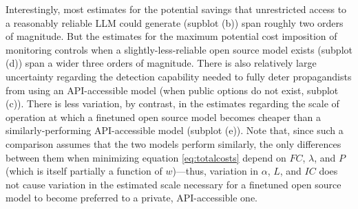 \documentclass{article}
\begin{document}
Interestingly, most estimates for the potential savings that unrestricted access to a reasonably reliable LLM could generate (supblot (b)) span roughly two orders of magnitude. But the estimates for the maximum potential cost imposition of monitoring controls when a slightly-less-reliable open source model exists (subplot (d)) span a wider three orders of magnitude. There is also relatively large uncertainty regarding the detection capability needed to fully deter propagandists from using an API-accessible model (when public options do not exist, subplot (c)). There is less variation, by contrast, in the estimates regarding the scale of operation at which a finetuned open source model becomes cheaper than a similarly-performing API-accessible model (subplot (e)). Note that, since such a comparison assumes that the two models perform similarly, the only differences between them when minimizing equation \ref{eq:totalcosts} depend on $FC$, $\lambda$, and $P$ (which is itself partially a function of $w$)—thus, variation in $\alpha$, $L$, and $IC$ does not cause variation in the estimated scale necessary for a finetuned open source model to become preferred to a private, API-accessible one.
\end{document}
